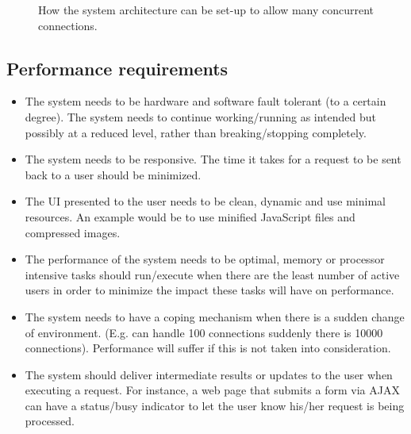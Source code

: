 \documentclass[a4paper,12pt,titlepage]{article}
\begin{document}
\begin{itemize}
\begin{figure}[H]
		\caption{How the system architecture can be set-up to allow many concurrent connections.}
		\label{fig:scalability}
	\end{figure}
\end{itemize}
\subsection{Performance requirements}
\begin{itemize}
	\item The system needs to be hardware and software fault tolerant (to a certain degree). The system needs to continue working/running as intended but possibly at a reduced level, rather than breaking/stopping completely.
	\item The system needs to be responsive. The time it takes for a request to be sent back to a user should be minimized. 
	\item The UI presented to the user needs to be clean, dynamic and use minimal resources. An example would be to use minified JavaScript files and compressed images.
	\item The performance of the system needs to be optimal, memory or processor intensive tasks should run/execute when there are the least number of active users in order to minimize the impact these tasks will have on performance.
	\item The system needs to have a coping mechanism when there is a sudden change of environment. (E.g. can handle 100 connections suddenly there is 10000 connections). Performance will suffer if this is not taken into consideration.
	\item The system should deliver intermediate results or updates to the user when executing a request. For instance, a web page that submits a form via AJAX can have a status/busy indicator to let the user know his/her request is being processed.
\end{itemize}
\end{document}
